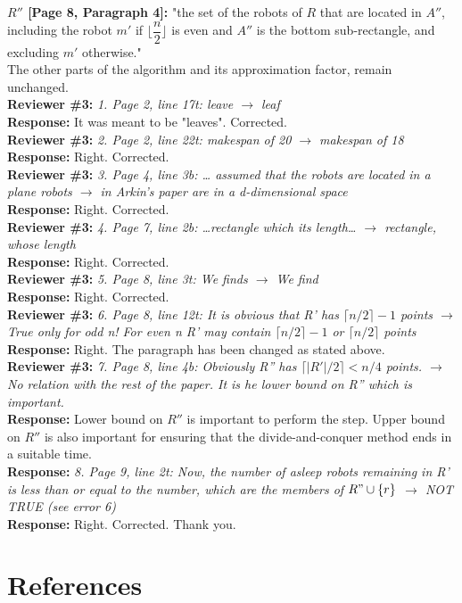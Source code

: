 \documentclass[review]{elsarticle}
\begin{document}
\textbf{$R''$ [Page 8, Paragraph 4]:} "the set of the robots of $R$ that are located in $A''$, including the robot $m'$ if $\lfloor\dfrac{n}{2}\rfloor$ is even and $A''$ is the bottom sub-rectangle, and excluding $m'$ otherwise."\\
The other parts of the algorithm and its approximation factor, remain unchanged.
\\
\textbf{Reviewer \#3:} \textit{1. Page 2, line 17t: leave $\rightarrow$	leaf}\\
\textbf{Response:} It was meant to be "leaves". Corrected.
\\
\textbf{Reviewer \#3:} \textit{2. Page 2, line 22t: makespan of 20 $\rightarrow$ makespan of 18}\\
\textbf{Response:} Right. Corrected.
\\
\textbf{Reviewer \#3:} \textit{3. Page 4, line 3b: … assumed that the robots are located in a plane robots $\rightarrow$ in Arkin's paper are in a d-dimensional space}\\
\textbf{Response:} Right. Corrected.
\\
\textbf{Reviewer \#3:} \textit{4. Page 7, line 2b:	…rectangle which its length… $\rightarrow$ rectangle, whose length}\\
\textbf{Response:} Right. Corrected.
\\
\textbf{Reviewer \#3:} \textit{5. Page 8, line 3t: We finds $\rightarrow$	We find}\\
\textbf{Response:} Right. Corrected.
\\
\textbf{Reviewer \#3:} \textit{6. Page 8, line 12t:	It is obvious that R' has $\lceil n/2 \rceil-1$ points $\rightarrow$ True only for odd n! For even n R' may contain $\lceil n/2 \rceil-1$ or $\lceil n/2 \rceil$ points}\\
\textbf{Response:} Right. The paragraph has been changed as stated above.
\\
\textbf{Reviewer \#3:} \textit{7. Page 8, line 4b: Obviously R'' has $\lceil |R'|/2 \rceil < n/ 4$ points. $\rightarrow$ No relation with the rest of the paper. It is he lower bound on R'' which is important.}\\
\textbf{Response:} Lower bound on $R''$ is important to perform the step. Upper bound on $R''$ is also important for ensuring that the divide-and-conquer method ends in a suitable time.
\\
\textbf{Response:} \textit{8. Page 9, line 2t: Now, the number of asleep robots remaining in R' is less than or equal to the number, which are the members of $R" \cup \{r\}$ $\rightarrow$ NOT TRUE (see error 6)}\\
\textbf{Response:} Right. Corrected. Thank you.

\section*{References}

\end{document}
